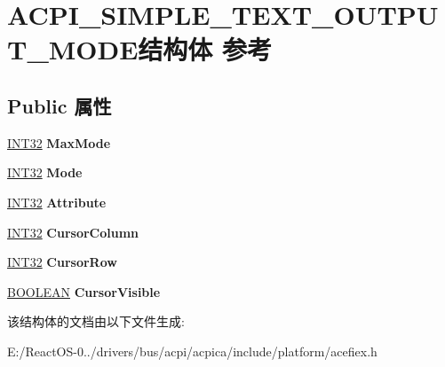 \hypertarget{struct_a_c_p_i___s_i_m_p_l_e___t_e_x_t___o_u_t_p_u_t___m_o_d_e}{}\section{A\+C\+P\+I\+\_\+\+S\+I\+M\+P\+L\+E\+\_\+\+T\+E\+X\+T\+\_\+\+O\+U\+T\+P\+U\+T\+\_\+\+M\+O\+D\+E结构体 参考}
\label{struct_a_c_p_i___s_i_m_p_l_e___t_e_x_t___o_u_t_p_u_t___m_o_d_e}
\subsection*{Public 属性}
\begin{DoxyCompactItemize}
\item 
\mbox{\label{struct_a_c_p_i___s_i_m_p_l_e___t_e_x_t___o_u_t_p_u_t___m_o_d_e_a1da6482cfe26f2a788400b5f6174f44e}} 
\hyperlink{_processor_bind_8h_a1137216524060afd426c34677fed058b}{I\+N\+T32} {\bfseries Max\+Mode}
\item 
\mbox{\label{struct_a_c_p_i___s_i_m_p_l_e___t_e_x_t___o_u_t_p_u_t___m_o_d_e_ab9e3ee5981034849beaf84ee972f5a38}} 
\hyperlink{_processor_bind_8h_a1137216524060afd426c34677fed058b}{I\+N\+T32} {\bfseries Mode}
\item 
\mbox{\label{struct_a_c_p_i___s_i_m_p_l_e___t_e_x_t___o_u_t_p_u_t___m_o_d_e_abd76c9cbe60df239a5dd34df0f4603e1}} 
\hyperlink{_processor_bind_8h_a1137216524060afd426c34677fed058b}{I\+N\+T32} {\bfseries Attribute}
\item 
\mbox{\label{struct_a_c_p_i___s_i_m_p_l_e___t_e_x_t___o_u_t_p_u_t___m_o_d_e_adf0f92408c8dcf01df3ea26c4a743de2}} 
\hyperlink{_processor_bind_8h_a1137216524060afd426c34677fed058b}{I\+N\+T32} {\bfseries Cursor\+Column}
\item 
\mbox{\label{struct_a_c_p_i___s_i_m_p_l_e___t_e_x_t___o_u_t_p_u_t___m_o_d_e_a657102aec04238deb38b1c14d4efeecd}} 
\hyperlink{_processor_bind_8h_a1137216524060afd426c34677fed058b}{I\+N\+T32} {\bfseries Cursor\+Row}
\item 
\mbox{\label{struct_a_c_p_i___s_i_m_p_l_e___t_e_x_t___o_u_t_p_u_t___m_o_d_e_a8ec21eec1fe7ce8b05c3474ca17147cb}} 
\hyperlink{_processor_bind_8h_a112e3146cb38b6ee95e64d85842e380a}{B\+O\+O\+L\+E\+AN} {\bfseries Cursor\+Visible}
\end{DoxyCompactItemize}


该结构体的文档由以下文件生成\+:\begin{DoxyCompactItemize}
\item 
E\+:/\+React\+O\+S-\/0../drivers/bus/acpi/acpica/include/platform/acefiex.\+h\end{DoxyCompactItemize}
